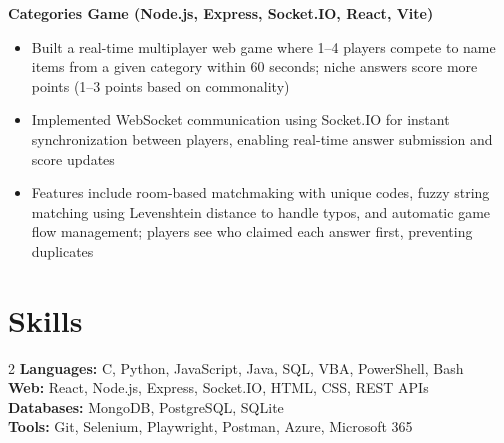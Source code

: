 \documentclass[a4paper,10pt]{article}
\begin{document}
\noindent\textbf{Categories Game (Node.js, Express, Socket.IO, React, Vite)}
\begin{itemize}
\item Built a real-time multiplayer web game where 1--4 players compete to name items from a given category within 60 seconds; niche answers score more points (1--3 points based on commonality)
\item Implemented WebSocket communication using Socket.IO for instant synchronization between players, enabling real-time answer submission and score updates
\item Features include room-based matchmaking with unique codes, fuzzy string matching using Levenshtein distance to handle typos, and automatic game flow management; players see who claimed each answer first, preventing duplicates
\end{itemize}
\vspace{2pt}
\section*{Skills}
\vspace{-2pt}
\begin{multicols}{2}
\setlength{\columnsep}{1em}
\noindent\textbf{Languages:} C, Python, JavaScript, Java, SQL, VBA, PowerShell, Bash \\
\textbf{Web:} React, Node.js, Express, Socket.IO, HTML, CSS, REST APIs \\
\textbf{Databases:} MongoDB, PostgreSQL, SQLite \\
\textbf{Tools:} Git, Selenium, Playwright, Postman, Azure, Microsoft 365
\end{multicols}
\end{document}
